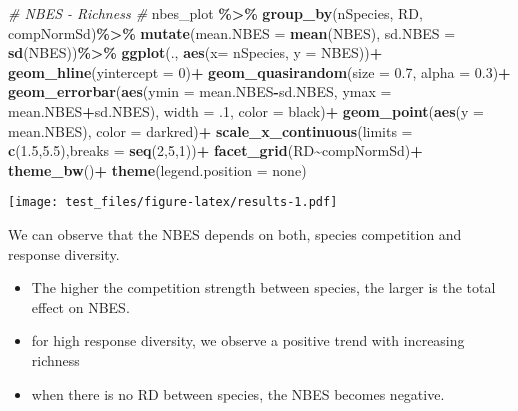 \documentclass[
]{article}
\newenvironment{Shaded}{\begin{snugshade}}{\end{snugshade}}
\newcommand{\AttributeTok}[1]{\textcolor[rgb]{0.13,0.29,0.53}{#1}}
\newcommand{\CommentTok}[1]{\textcolor[rgb]{0.56,0.35,0.01}{\textit{#1}}}
\newcommand{\DecValTok}[1]{\textcolor[rgb]{0.00,0.00,0.81}{#1}}
\newcommand{\FloatTok}[1]{\textcolor[rgb]{0.00,0.00,0.81}{#1}}
\newcommand{\FunctionTok}[1]{\textcolor[rgb]{0.13,0.29,0.53}{\textbf{#1}}}
\newcommand{\NormalTok}[1]{#1}
\newcommand{\SpecialCharTok}[1]{\textcolor[rgb]{0.81,0.36,0.00}{\textbf{#1}}}
\newcommand{\StringTok}[1]{\textcolor[rgb]{0.31,0.60,0.02}{#1}}
\providecommand{\tightlist}{%
  \setlength{\itemsep}{0pt}\setlength{\parskip}{0pt}}
\begin{document}
\begin{Shaded}
\begin{Highlighting}[]
\CommentTok{\# NBES {-} Richness \#}
\NormalTok{nbes\_plot }\SpecialCharTok{\%\textgreater{}\%}
  \FunctionTok{group\_by}\NormalTok{(nSpecies, RD, compNormSd)}\SpecialCharTok{\%\textgreater{}\%}
  \FunctionTok{mutate}\NormalTok{(}\AttributeTok{mean.NBES =} \FunctionTok{mean}\NormalTok{(NBES),}
         \AttributeTok{sd.NBES =} \FunctionTok{sd}\NormalTok{(NBES))}\SpecialCharTok{\%\textgreater{}\%}
  \FunctionTok{ggplot}\NormalTok{(., }\FunctionTok{aes}\NormalTok{(}\AttributeTok{x=}\NormalTok{ nSpecies, }\AttributeTok{y =}\NormalTok{ NBES))}\SpecialCharTok{+}
    \FunctionTok{geom\_hline}\NormalTok{(}\AttributeTok{yintercept =} \DecValTok{0}\NormalTok{)}\SpecialCharTok{+}
    \FunctionTok{geom\_quasirandom}\NormalTok{(}\AttributeTok{size =} \FloatTok{0.7}\NormalTok{, }\AttributeTok{alpha =} \FloatTok{0.3}\NormalTok{)}\SpecialCharTok{+}
    \FunctionTok{geom\_errorbar}\NormalTok{(}\FunctionTok{aes}\NormalTok{(}\AttributeTok{ymin =}\NormalTok{ mean.NBES}\SpecialCharTok{{-}}\NormalTok{sd.NBES, }\AttributeTok{ymax =}\NormalTok{ mean.NBES}\SpecialCharTok{+}\NormalTok{sd.NBES), }\AttributeTok{width =}\NormalTok{ .}\DecValTok{1}\NormalTok{, }\AttributeTok{color =} \StringTok{\textquotesingle{}black\textquotesingle{}}\NormalTok{)}\SpecialCharTok{+}
    \FunctionTok{geom\_point}\NormalTok{(}\FunctionTok{aes}\NormalTok{(}\AttributeTok{y =}\NormalTok{ mean.NBES), }\AttributeTok{color =} \StringTok{\textquotesingle{}darkred\textquotesingle{}}\NormalTok{)}\SpecialCharTok{+}
   \FunctionTok{scale\_x\_continuous}\NormalTok{(}\AttributeTok{limits =} \FunctionTok{c}\NormalTok{(}\FloatTok{1.5}\NormalTok{,}\FloatTok{5.5}\NormalTok{),}\AttributeTok{breaks =} \FunctionTok{seq}\NormalTok{(}\DecValTok{2}\NormalTok{,}\DecValTok{5}\NormalTok{,}\DecValTok{1}\NormalTok{))}\SpecialCharTok{+}
    \FunctionTok{facet\_grid}\NormalTok{(RD}\SpecialCharTok{\textasciitilde{}}\NormalTok{compNormSd)}\SpecialCharTok{+}
    \FunctionTok{theme\_bw}\NormalTok{()}\SpecialCharTok{+}
    \FunctionTok{theme}\NormalTok{(}\AttributeTok{legend.position =} \StringTok{\textquotesingle{}none\textquotesingle{}}\NormalTok{)}
\end{Highlighting}
\end{Shaded}

\texttt{[image: test\_files/figure-latex/results-1.pdf]}

We can observe that the NBES depends on both, species competition and
response diversity.

\begin{itemize}
\tightlist
\item
  The higher the competition strength between species, the larger is the
  total effect on NBES.
\item
  for high response diversity, we observe a positive trend with
  increasing richness
\item
  when there is no RD between species, the NBES becomes negative.
\end{itemize}
\end{document}
